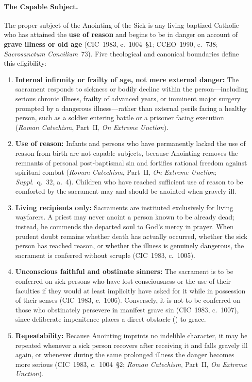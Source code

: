 \paragraph{The Capable Subject.}
The proper subject of the Anointing of the Sick is any living baptized Catholic who has attained the \textbf{use of reason} and begins to be in danger on account of \textbf{grave illness or old age} (CIC~1983, c.~1004~\S1; CCEO~1990, c.~738; \emph{Sacrosanctum Concilium}~73). Five theological and canonical boundaries define this eligibility:
\begin{enumerate}
  \item \textbf{Internal infirmity or frailty of age, not mere external danger:} The sacrament responds to sickness or bodily decline within the person---including serious chronic illness, frailty of advanced years, or imminent major surgery prompted by a dangerous illness---rather than external perils facing a healthy person, such as a soldier entering battle or a prisoner facing execution (\emph{Roman Catechism}, Part~II, \emph{On Extreme Unction}).
  \item \textbf{Use of reason:} Infants and persons who have permanently lacked the use of reason from birth are not capable subjects, because Anointing removes the remnants of personal post-baptismal sin and fortifies rational freedom against spiritual combat (\emph{Roman Catechism}, Part~II, \emph{On Extreme Unction}; \emph{Suppl.}~q.~32, a.~4). Children who have reached sufficient use of reason to be comforted by the sacrament may and should be anointed when gravely ill.
  \item \textbf{Living recipients only:} Sacraments are instituted exclusively for living wayfarers. A priest may never anoint a person known to be already dead; instead, he commends the departed soul to God's mercy in prayer. When prudent doubt remains whether death has actually occurred, whether the sick person has reached reason, or whether the illness is genuinely dangerous, the sacrament is conferred without scruple (CIC~1983, c.~1005).
  \item \textbf{Unconscious faithful and obstinate sinners:} The sacrament is to be conferred on sick persons who have lost consciousness or the use of their faculties if they would at least implicitly have asked for it while in possession of their senses (CIC~1983, c.~1006). Conversely, it is not to be conferred on those who obstinately persevere in manifest grave sin (CIC~1983, c.~1007), since deliberate impenitence places a direct obstacle () to grace.
  \item \textbf{Repeatability:} Because Anointing imprints no indelible character, it may be repeated whenever a sick person recovers after receiving it and falls gravely ill again, or whenever during the same prolonged illness the danger becomes more serious (CIC~1983, c.~1004~\S2; \emph{Roman Catechism}, Part~II, \emph{On Extreme Unction}).
\end{enumerate}

